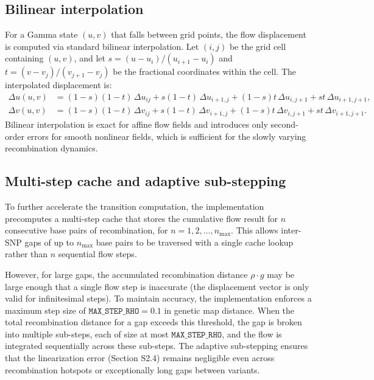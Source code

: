 \documentclass[10pt,letterpaper]{article}
\begin{document}
\subsection{Bilinear interpolation}

For a Gamma state $(u, v)$ that falls between grid points, the flow displacement is computed via standard bilinear interpolation. Let $(i, j)$ be the grid cell containing $(u, v)$, and let $s = (u - u_i)/(u_{i+1} - u_i)$ and $t = (v - v_j)/(v_{j+1} - v_j)$ be the fractional coordinates within the cell. The interpolated displacement is:
\begin{align}
\Delta u(u, v) &= (1-s)(1-t)\, \Delta u_{ij} + s(1-t)\, \Delta u_{i+1,j} + (1-s)t\, \Delta u_{i,j+1} + st\, \Delta u_{i+1,j+1}, \\
\Delta v(u, v) &= (1-s)(1-t)\, \Delta v_{ij} + s(1-t)\, \Delta v_{i+1,j} + (1-s)t\, \Delta v_{i,j+1} + st\, \Delta v_{i+1,j+1}.
\end{align}
Bilinear interpolation is exact for affine flow fields and introduces only second-order errors for smooth nonlinear fields, which is sufficient for the slowly varying recombination dynamics.

\subsection{Multi-step cache and adaptive sub-stepping}

To further accelerate the transition computation, the implementation precomputes a multi-step cache that stores the cumulative flow result for $n$ consecutive base pairs of recombination, for $n = 1, 2, \ldots, n_{\max}$. This allows inter-SNP gaps of up to $n_{\max}$ base pairs to be traversed with a single cache lookup rather than $n$ sequential flow steps.

However, for large gaps, the accumulated recombination distance $\rho \cdot g$ may be large enough that a single flow step is inaccurate (the displacement vector is only valid for infinitesimal steps). To maintain accuracy, the implementation enforces a maximum step size of $\texttt{MAX\_STEP\_RHO} = 0.1$ in genetic map distance. When the total recombination distance for a gap exceeds this threshold, the gap is broken into multiple sub-steps, each of size at most $\texttt{MAX\_STEP\_RHO}$, and the flow is integrated sequentially across these sub-steps. The adaptive sub-stepping ensures that the linearization error (Section S2.4) remains negligible even across recombination hotspots or exceptionally long gaps between variants.
\end{document}
